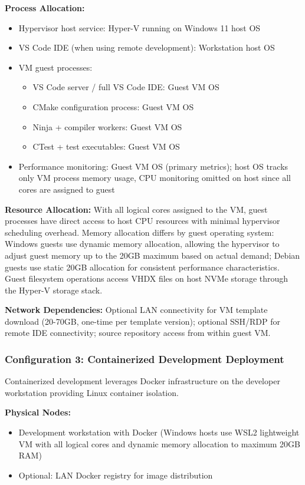 \textbf{Process Allocation:}
\begin{itemize}
\item Hypervisor host service: Hyper-V running on Windows 11 host OS
\item VS Code IDE (when using remote development): Workstation host OS
\item VM guest processes:
  \begin{itemize}
  \item VS Code server / full VS Code IDE: Guest VM OS
  \item CMake configuration process: Guest VM OS
  \item Ninja + compiler workers: Guest VM OS
  \item CTest + test executables: Guest VM OS
  \end{itemize}
\item Performance monitoring: Guest VM OS (primary metrics); host OS tracks only VM process memory usage, CPU monitoring omitted on host since all cores are assigned to guest
\end{itemize}

\textbf{Resource Allocation:} With all logical cores assigned to the VM, guest processes have direct access to host CPU resources with minimal hypervisor scheduling overhead.
Memory allocation differs by guest operating system: Windows guests use dynamic memory allocation, allowing the hypervisor to adjust guest memory up to the 20GB maximum based on actual demand; Debian guests use static 20GB allocation for consistent performance characteristics.
Guest filesystem operations access VHDX files on host NVMe storage through the Hyper-V storage stack.

\textbf{Network Dependencies:} Optional LAN connectivity for VM template download (20-70GB, one-time per template version); optional SSH/RDP for remote IDE connectivity; source repository access from within guest VM.

\subsubsection{Configuration 3: Containerized Development Deployment}

Containerized development leverages Docker infrastructure on the developer workstation providing Linux container isolation.

\textbf{Physical Nodes:}
\begin{itemize}
\item Development workstation with Docker (Windows hosts use WSL2 lightweight VM with all logical cores and dynamic memory allocation to maximum 20GB RAM)
\item Optional: LAN Docker registry for image distribution
\end{itemize}

